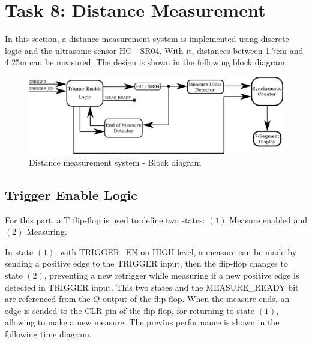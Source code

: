 

\section*{Task 8: Distance Measurement}
In this section, a distance measurement system is 
implemented using discrete logic and the ultrasonic 
sensor HC - SR04. With it, distances between 1.7cm 
and 4.25m can be measured. The design is shown in 
the following block diagram.

\begin{figure}[H]
    \begin{centering}
    \includegraphics[width=1\textwidth]{blockDiagram}
    \par\end{centering}
    \caption{Distance measurement system - Block diagram}
\end{figure}

\subsection*{Trigger Enable Logic}
For this part, a T flip-flop is used to
define two states: $(1)$ Measure enabled and $(2)$ Measuring.
\par
In state $(1)$, with TRIGGER\_EN on HIGH level, a measure 
can be made by sending a positive edge to the TRIGGER input, 
then the flip-flop changes to state $(2)$, preventing a new 
retrigger while measuring if a new positive edge is detected 
in TRIGGER input. This two states and the MEASURE\_READY bit 
are referenced from the $\overline{Q}$ output of the flip-flop. 
When the measure ends, an edge is sended to 
the CLR pin of the flip-flop, for returning to state $(1)$, allowing
to make a new measure. The previus performance is shown in the 
following time diagram.

